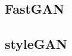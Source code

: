 \documentclass[letterpaper,12pt,oneside]{book}
\begin{document}
                    
                \subsection{FastGAN}

                \subsection{styleGAN}

            
            


        \printbibliography
        \nocite{*}
        \backmatter%

    
\end{document}
